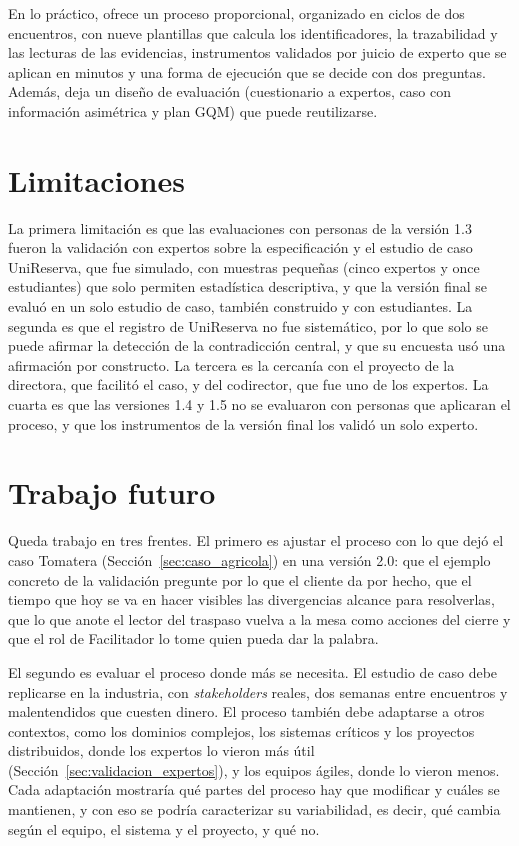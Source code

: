 \documentclass[12pt,letterpaper,oneside]{report}
\begin{document}
En lo práctico, ofrece un proceso proporcional, organizado en ciclos de dos encuentros, con nueve
plantillas que calcula los identificadores, la
trazabilidad y las lecturas de las evidencias, instrumentos validados por juicio
de experto que se aplican en minutos y una forma de ejecución que se decide con
dos preguntas. Además, deja un diseño de evaluación (cuestionario a expertos,
caso con información asimétrica y plan GQM) que puede reutilizarse.

\section{Limitaciones}
La primera limitación es que las evaluaciones con personas de la versión 1.3
fueron la validación con expertos sobre la especificación y el estudio de caso
UniReserva, que fue simulado, con muestras pequeñas (cinco expertos y once estudiantes) que solo
permiten estadística descriptiva, y que la versión final se evaluó en un solo
estudio de caso, también construido y con estudiantes. La segunda es que el registro de UniReserva no fue
sistemático, por lo que solo se puede afirmar la detección de la contradicción
central, y que su encuesta usó una afirmación por constructo. La tercera es la
cercanía con el proyecto de la directora, que facilitó el caso, y del
codirector, que fue uno de los expertos. La cuarta es que las versiones 1.4 y
1.5 no se evaluaron con personas que aplicaran el proceso, y que los
instrumentos de la versión final los validó un solo experto.

\section{Trabajo futuro}
\label{sec:trabajo_futuro}
Queda trabajo en tres frentes. El primero es ajustar el proceso con lo que dejó
el caso Tomatera (Sección~\ref{sec:caso_agricola}) en una versión 2.0: que el
ejemplo concreto de la validación pregunte por lo que el cliente da por hecho,
que el tiempo que hoy se va en hacer visibles las divergencias alcance para
resolverlas, que lo que anote el lector del traspaso vuelva a la mesa como
acciones del cierre y que el rol de Facilitador lo tome quien pueda dar la
palabra.

El segundo es evaluar el proceso donde más se necesita. El estudio de caso debe
replicarse en la industria, con \textit{stakeholders} reales, dos semanas entre
encuentros y malentendidos que cuesten dinero. El proceso también debe adaptarse
a otros contextos, como los dominios complejos, los sistemas críticos y los
proyectos distribuidos, donde los expertos lo vieron más útil
(Sección~\ref{sec:validacion_expertos}), y los equipos ágiles, donde lo vieron
menos. Cada adaptación mostraría qué partes del proceso hay que modificar y
cuáles se mantienen, y con eso se podría caracterizar su variabilidad, es decir,
qué cambia según el equipo, el sistema y el proyecto, y qué no.
\end{document}
